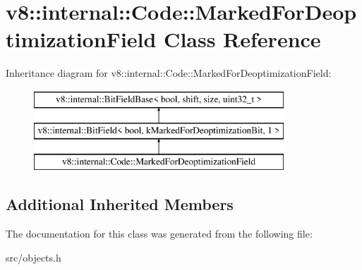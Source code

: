 \hypertarget{classv8_1_1internal_1_1_code_1_1_marked_for_deoptimization_field}{}\section{v8\+:\+:internal\+:\+:Code\+:\+:Marked\+For\+Deoptimization\+Field Class Reference}
\label{classv8_1_1internal_1_1_code_1_1_marked_for_deoptimization_field}
Inheritance diagram for v8\+:\+:internal\+:\+:Code\+:\+:Marked\+For\+Deoptimization\+Field\+:\begin{figure}[H]
\begin{center}
\leavevmode
\includegraphics[height=3.000000cm]{classv8_1_1internal_1_1_code_1_1_marked_for_deoptimization_field}
\end{center}
\end{figure}
\subsection*{Additional Inherited Members}


The documentation for this class was generated from the following file\+:\begin{DoxyCompactItemize}
\item 
src/objects.\+h\end{DoxyCompactItemize}

